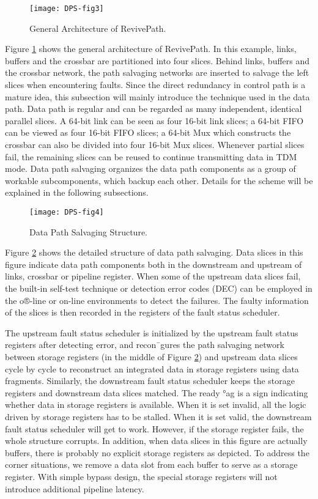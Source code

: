 \begin{figure}[h]
      \centering
        \texttt{[image: DPS-fig3]}
        \caption{General Architecture of RevivePath.}
        \label{fig:dps-fig3}
\end{figure}


Figure \ref{fig:dps-fig3} shows the general architecture of RevivePath. In this example, links, buffers and the crossbar are partitioned into four slices. Behind links, buffers and the crossbar network, the path salvaging networks are inserted to salvage the left slices when encountering faults. Since the direct redundancy in control path is a mature idea, this subsection will mainly introduce the technique used in the data path. Data path is regular and can be regarded as many independent, identical parallel slices. A 64-bit link can be seen as four 16-bit link slices; a 64-bit FIFO can be viewed as four 16-bit FIFO slices; a 64-bit Mux which constructs the crossbar can also be divided into four 16-bit Mux slices. Whenever partial slices fail, the remaining slices can be reused to continue transmitting data in TDM mode. Data path salvaging organizes the data path components as a group of workable subcomponents, which backup each other. Details for the scheme will be explained in the following subsections.

\begin{figure}[h]
      \centering
        \texttt{[image: DPS-fig4]}
        \caption{Data Path Salvaging Structure.}
        \label{fig:dps-fig4}
\end{figure}


Figure \ref{fig:dps-fig4} shows the detailed structure of data path salvaging. Data slices in this figure indicate data path components both in the downstream and upstream of links, crossbar or pipeline register. When some of the upstream data slices fail, the built-in self-test technique \cite{fick2009highly} \cite{alaghi2007online} or detection error codes (DEC) can be employed in the o®-line or on-line environments to detect the failures. The faulty information of the slices is then recorded in the registers of the fault status scheduler.

The upstream fault status scheduler is initialized by the upstream fault status registers after detecting error, and recon¯gures the path salvaging network between storage registers (in the middle of Figure \ref{fig:dps-fig4}) and upstream data slices cycle by cycle to reconstruct an integrated data in storage registers using data fragments. Similarly, the downstream fault status scheduler keeps the storage registers and downstream data slices matched. The ready °ag is a sign indicating whether data in storage registers is available. When it is set invalid, all the logic driven by storage registers has to be stalled. When it is set valid, the downstream fault status scheduler will get to work. However, if the storage register fails, the whole structure corrupts. In addition, when data slices in this figure are actually buffers, there is probably no explicit storage registers as depicted. To address the corner situations, we remove a data slot from each buffer to serve as a storage register. With simple bypass design, the special storage registers will not introduce additional pipeline latency. 

